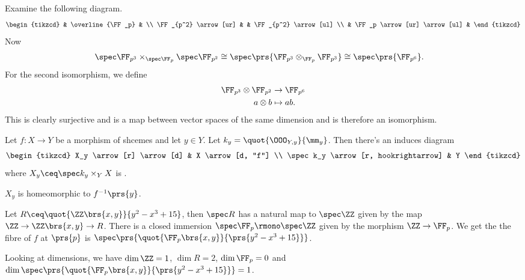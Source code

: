 \documentclass[10pt,a4paper,twoside,openany,hidelinks]{book}
\begin{document}
\begin{example}
Examine the following diagram.
$$
\begin{tikzcd}
& \overline{\FF_p} & \\
\FF_{p^2} \arrow[ur] & & \FF_{p^2} \arrow[ul] \\
& \FF_p \arrow[ur] \arrow[ul] &
\end{tikzcd}
$$
Now
\begin{align*}
    \spec \FF_{p^3} \times_{\spec \FF_p} \spec \FF_{p^2} &\cong \spec\prs{\FF_{p^3} \otimes_{\FF_p} \FF_{p^3}} \cong \spec\prs{\FF_{p^6}} \text{.}
\end{align*}
For the second isomorphism, we define
\begin{align*}
    \FF_{p^3} \otimes \FF_{p^2} &\to \FF_{p^6} \\
    a \otimes b &\mapsto ab \text{.}
\end{align*}
This is clearly surjective and is a map between vector spaces of the same dimension and is therefore an isomorphism.
\end{example}

\begin{definition}[Fibres]
Let $f \colon X \to Y$ be a morphism of shcemes and let $y \in Y$. Let $k_y = \quot{\OOO_{Y,y}}{\mm_y}$. Then
there's an induces diagram
$$
\begin{tikzcd}
X_y \arrow[r] \arrow[d] & X \arrow[d, "f"] \\ \spec k_y \arrow[r, hookrightarrow] & Y
\end{tikzcd}
$$
where $X_y \ceq \spec k_y \times_Y X$ is .
\end{definition}


\begin{exercise}
$X_y$ is homeomorphic to $f^{-1}\prs{y}$.
\end{exercise}

\begin{example}
Let $R \ceq \quot{\ZZ\brs{x,y}}{y^2 - x^3 + 15}$, then $\spec R$ has a natural map to $\spec \ZZ$ given by the map $\ZZ \to \ZZ\brs{x,y} \to R$.
There is a closed immersion $\spec \FF_p \rmono \spec \ZZ$ given by the morphism $\ZZ \to \FF_p$.
We get the the fibre of $f$ at $\prs{p}$ is $\spec \prs{\quot{\FF_p\brs{x,y}}{\prs{y^2 - x^3 + 15}}}$.

Looking at dimensions, we have $\dim \ZZ = 1$, $\dim R = 2$, $\dim \FF_p = 0$ and $\dim \spec \prs{\quot{\FF_p\brs{x,y}}{\prs{y^2 - x^3 + 15}}} = 1$.
\end{example}
\end{document}

